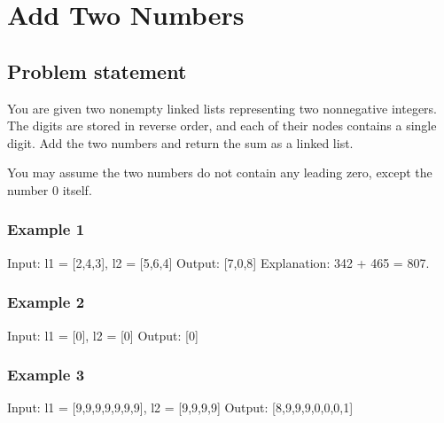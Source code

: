 \documentclass[letterpaper,12pt,english]{book}
\begin{document}
\sphinxstepscope


\section{Add Two Numbers}
\label{\detokenize{Linked_List/02_LL_2_add_two_numbers:add-two-numbers}}\label{\detokenize{Linked_List/02_LL_2_add_two_numbers::doc}}

\subsection{Problem statement\sphinxfootnotemark[22]}
\label{\detokenize{Linked_List/02_LL_2_add_two_numbers:problem-statement}}%
\begin{footnotetext}[22]\sphinxAtStartFootnote
{}
%
\end{footnotetext}\ignorespaces 
\sphinxAtStartPar
You are given two non\sphinxhyphen{}empty linked lists representing two non\sphinxhyphen{}negative integers. The digits are stored in reverse order, and each of their nodes contains a single digit. Add the two numbers and return the sum as a linked list.

\sphinxAtStartPar
You may assume the two numbers do not contain any leading zero, except the number 0 itself.


\subsubsection{Example 1}
\label{\detokenize{Linked_List/02_LL_2_add_two_numbers:example-1}}
\sphinxAtStartPar
{}

\begin{sphinxVerbatim}[commandchars=\\\{\}]
Input: l1 = [2,4,3], l2 = [5,6,4]
Output: [7,0,8]
Explanation: 342 + 465 = 807.
\end{sphinxVerbatim}


\subsubsection{Example 2}
\label{\detokenize{Linked_List/02_LL_2_add_two_numbers:example-2}}
\begin{sphinxVerbatim}[commandchars=\\\{\}]
Input: l1 = [0], l2 = [0]
Output: [0]
\end{sphinxVerbatim}


\subsubsection{Example 3}
\label{\detokenize{Linked_List/02_LL_2_add_two_numbers:example-3}}
\begin{sphinxVerbatim}[commandchars=\\\{\}]
Input: l1 = [9,9,9,9,9,9,9], l2 = [9,9,9,9]
Output: [8,9,9,9,0,0,0,1]
\end{sphinxVerbatim}
\end{document}
